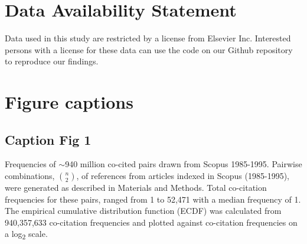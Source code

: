 \documentclass[utf8]{frontiersSCNS}
\begin{document}

\section*{Data Availability Statement}
Data used in this study are restricted by a license from Elsevier Inc. Interested persons with a license for these data can use the code on our Github repository~\citep{Korobskiy2019} to reproduce our findings. 

 


\section*{Figure captions}

\subsection{Caption Fig 1} Frequencies of $\sim$940 million co-cited pairs drawn from Scopus 1985-1995. Pairwise combinations, $n\choose 2$, of references from articles indexed in Scopus (1985-1995), were generated as described in Materials and Methods. Total co-citation frequencies for these pairs, ranged from 1 to 52,471 with a median frequency of 1. The empirical cumulative distribution function (ECDF) was calculated from 940,357,633 co-citation frequencies and plotted against co-citation frequencies on a log\textsubscript{2} scale.
\end{document}
